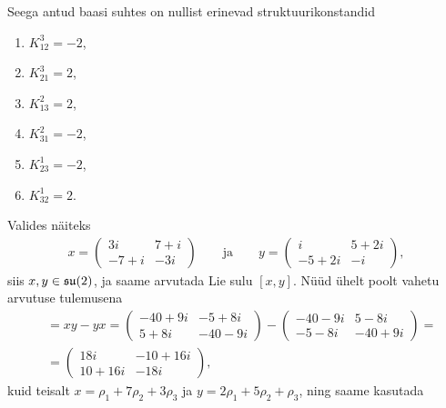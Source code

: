 \begin{naide}
    Seega antud baasi suhtes on nullist erinevad struktuurikonstandid
    \begin{multicols}{3}
        \begin{enumerate}
            \item $K_{12}^{3} = -2$,
            \item $K_{21}^{3} = 2$,
            \item $K_{13}^{2} = 2$,
            \item $K_{31}^{2} = -2$,
            \item $K_{23}^{1} = -2$,
            \item $K_{32}^{1} = 2$.
        \end{enumerate}
    \end{multicols}

    Valides näiteks
    \begin{align*}
        x = \begin{pmatrix}
              3i & 7+i \\
            -7+i & -3i
        \end{pmatrix}
        \quad\quad \text{ja} \quad\quad
        y = \begin{pmatrix}
            i & 5 + 2i \\
            -5+2i &     -i
        \end{pmatrix},
    \end{align*}
    siis $x, y  \in \mathfrak{su}(2)$, ja saame arvutada Lie sulu $[x, y]$.
    Nüüd ühelt poolt vahetu arvutuse tulemusena
    \begin{align*}
        [x, y] &= xy - yx =
            \begin{pmatrix}
                -40+9i &  -5+8i \\
                  5+8i & -40-9i
            \end{pmatrix} - 
            \begin{pmatrix}
                -40-9i &   5-8i \\
                 -5-8i & -40+9i
            \end{pmatrix} = \\[0.1cm]
            &= \begin{pmatrix}
                   18i & -10+16i \\
                10+16i &    -18i
            \end{pmatrix},
    \end{align*}
    kuid teisalt $x = \rho_1 + 7\rho_2 + 3\rho_3$ ja
    $y = 2\rho_1 + 5\rho_2 + \rho_3$, ning saame kasutada

\end{naide}
